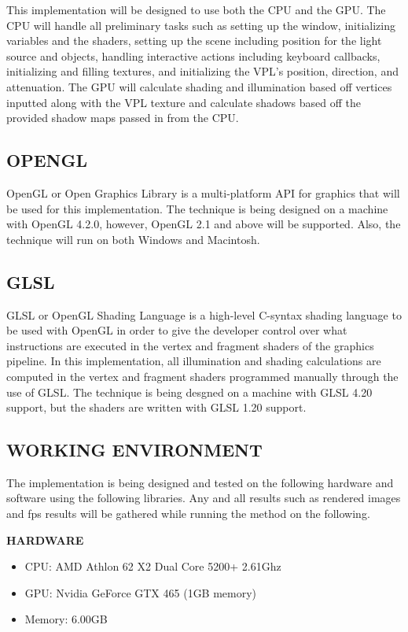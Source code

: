This implementation will be designed to use both the CPU and the GPU.  The CPU will handle all preliminary tasks such as setting up the window, initializing variables and the shaders, setting up the scene including position for the light source and objects, handling interactive actions including keyboard callbacks, initializing and filling textures, and initializing the VPL's position, direction, and attenuation.  The GPU will calculate shading and illumination based off vertices inputted along with the VPL texture and calculate shadows based off the provided shadow maps passed in from the CPU.

\subsection{OPENGL}

OpenGL or Open Graphics Library is a multi-platform API for graphics that will be used for this implementation.  The technique is being designed on a machine with OpenGL 4.2.0, however, OpenGL 2.1 and above will be supported.  Also, the technique will run on both Windows and Macintosh.

\subsection{GLSL}

GLSL or OpenGL Shading Language is a high-level C-syntax shading language to be used with OpenGL in order to give the developer control over what instructions are executed in the vertex and fragment shaders of the graphics pipeline.  In this implementation, all illumination and shading calculations are computed in the vertex and fragment shaders programmed manually through the use of GLSL.  The technique is being desgned on a machine with GLSL 4.20 support, but the shaders are written with GLSL 1.20 support.

\subsection{WORKING ENVIRONMENT}

The implementation is being designed and tested on the following hardware and software using the following libraries.  Any and all results such as rendered images and fps results will be gathered while running the method on the following.

\vspace{10 mm}

\textbf{HARDWARE}
\begin{itemize}
\item CPU: AMD Athlon 62 X2 Dual Core 5200+ 2.61Ghz
\item GPU: Nvidia GeForce GTX 465 (1GB memory)
\item Memory: 6.00GB
\end{itemize}

